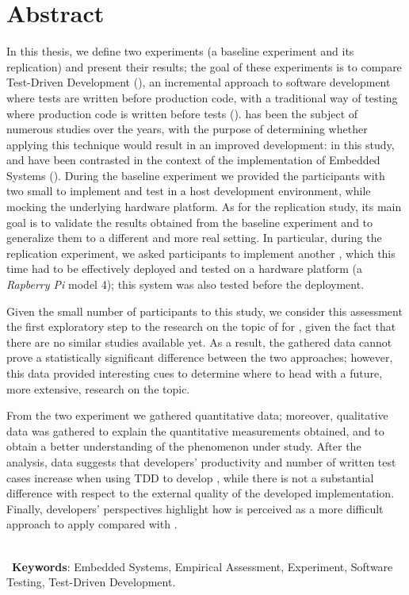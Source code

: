 \chapter*{Abstract}
In this thesis, we define two experiments (\ie a baseline experiment and its replication) and present their results; the goal of these experiments is to compare Test-Driven Development (\tdd), an incremental approach to software development where tests are written before production code, with a traditional way of testing where production code is written before tests (\ie \notdd). 
\tdd has been the subject of numerous studies over the years, with the purpose of determining whether applying this technique would result in an improved development: in this study, \tdd and \notdd have been contrasted in the context of the implementation of Embedded Systems (\ess).
During the baseline experiment we provided the participants with two small \ess to implement and test in a host development environment, while mocking the underlying hardware platform.
As for the replication study, its main goal is to validate the results obtained from the baseline experiment and to generalize them to a different and more real setting. 
In particular, during the replication experiment, we asked participants to implement another \es, which this time had to be effectively deployed and tested on a hardware platform (\ie a \textit{Rapberry Pi} model 4); this system was also tested before the deployment.

Given the small number of participants to this study, we consider this assessment the first exploratory step to the research on the topic of \tdd for \ess, given the fact that there are no similar studies available yet. As a result, the gathered data cannot prove a statistically significant difference between the two approaches; however, this data provided interesting cues to determine where to head with a future, more extensive, research on the topic.

From the two experiment we gathered quantitative data; moreover, qualitative data was gathered to explain the quantitative measurements obtained, and to obtain a better understanding of the phenomenon under study.
After the analysis, data suggests that developers' productivity and number of written test cases increase when using TDD to develop \ess, while there is not a substantial difference with respect to the external quality of the developed implementation. 
Finally, developers' perspectives highlight how \tdd is perceived as a more difficult approach to apply compared with \notdd.

\ \\ \
\noindent \textbf{Keywords}: Embedded Systems, Empirical Assessment, Experiment, Software Testing, Test-Driven Development.